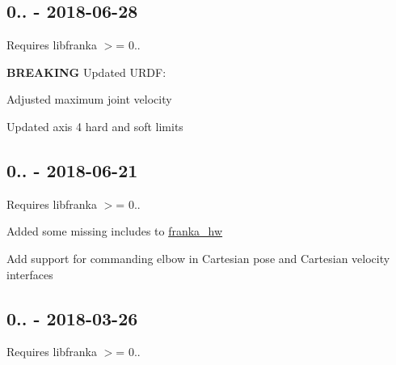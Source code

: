 \subsection*{0.. -\/ 2018-\/06-\/28}

Requires {\ttfamily libfranka} $>$= 0..


\begin{DoxyItemize}
\item {\bfseries B\+R\+E\+A\+K\+I\+NG} Updated U\+R\+DF\+:
\begin{DoxyItemize}
\item Adjusted maximum joint velocity
\item Updated axis 4 hard and soft limits
\end{DoxyItemize}
\end{DoxyItemize}

\subsection*{0.. -\/ 2018-\/06-\/21}

Requires {\ttfamily libfranka} $>$= 0..


\begin{DoxyItemize}
\item Added some missing includes to {\ttfamily \hyperlink{namespacefranka__hw}{franka\+\_\+hw}}
\item Add support for commanding elbow in Cartesian pose and Cartesian velocity interfaces
\end{DoxyItemize}

\subsection*{0.. -\/ 2018-\/03-\/26}

Requires {\ttfamily libfranka} $>$= 0..


